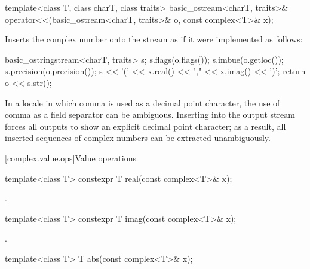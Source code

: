 %
\begin{itemdecl}
template<class T, class charT, class traits>
  basic_ostream<charT, traits>& operator<<(basic_ostream<charT, traits>& o, const complex<T>& x);
\end{itemdecl}

\begin{itemdescr}
\pnum
\effects
Inserts the complex number 
onto the stream  as if it were implemented as follows:

\begin{codeblock}
basic_ostringstream<charT, traits> s;
s.flags(o.flags());
s.imbue(o.getloc());
s.precision(o.precision());
s << '(' << x.real() << "," << x.imag() << ')';
return o << s.str();
\end{codeblock}

\pnum
\begin{note}
In a locale in which comma is used as a decimal point character, the
use of comma as a field separator can be ambiguous. Inserting
 into the output stream forces all outputs to
show an explicit decimal point character; as a result, all inserted sequences of
complex numbers can be extracted unambiguously.
\end{note}
\end{itemdescr}

[complex.value.ops]{Value operations}

%
\begin{itemdecl}
template<class T> constexpr T real(const complex<T>& x);
\end{itemdecl}

\begin{itemdescr}
\pnum
\returns
{}.
\end{itemdescr}

%
\begin{itemdecl}
template<class T> constexpr T imag(const complex<T>& x);
\end{itemdecl}

\begin{itemdescr}
\pnum
\returns
{}.
\end{itemdescr}

%
\begin{itemdecl}
template<class T> T abs(const complex<T>& x);
\end{itemdecl}

